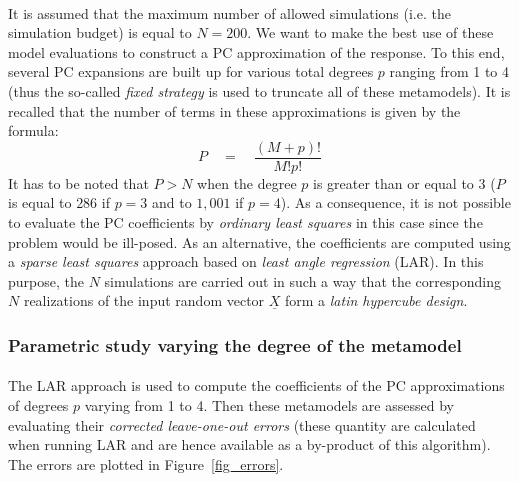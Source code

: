 \documentclass[11pt]{article}
\begin{document}
\paragraph{}
It is assumed that the maximum number of allowed simulations (i.e. the simulation budget) is equal to $N=200$. We want to make the best use of these model evaluations to construct a PC approximation of the response. To this end, several PC expansions are built up for various total degrees $p$ ranging from 1 to 4 (thus the so-called \emph{fixed strategy} is used to truncate all of these metamodels). It is recalled that the number of terms in these approximations is given by the formula:
\begin{equation}
  P \quad = \quad \frac{(M+p)!}{M!p!}
\end{equation}
It has to be noted that $P>N$ when the degree $p$ is greater than or equal to 3 ($P$ is equal to $286$ if $p=3$ and to $1,001$ if $p=4$). As a consequence, it is not possible to evaluate the PC coefficients by \emph{ordinary least squares} in this case since the problem would be ill-posed. As an alternative, the coefficients are computed using a \emph{sparse least squares} approach based on \emph{least angle regression} (LAR). In this purpose, the $N$ simulations are carried out in such a way that the corresponding $N$ realizations of the input random vector $\underline{X}$ form a \emph{latin hypercube design}.

\subsubsection{Parametric study varying the degree of the metamodel}

\paragraph{}
The LAR approach is used to compute the coefficients of the PC approximations of degrees $p$ varying from 1 to 4. Then these metamodels are assessed by evaluating their \emph{corrected leave-one-out errors} (these quantity are calculated when running LAR and are hence available as a by-product of this algorithm). The errors are plotted in Figure~\ref{fig_errors}.
\end{document}
